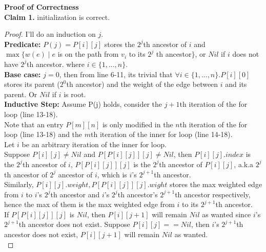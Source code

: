 \documentclass[11pt]{article}
\begin{document}
\textbf{Proof of Correctness} \\
\textbf{Claim 1. } initialization is correct. 
\begin{proof} I'll do an induction on $j$. \\
\textbf{Predicate: } $P(j) = P[i][j]$ stores the $2^j$th ancestor of $i$ and \\
$\max\{w(e)\mid e$ is on the path from $v_i$ to its $2^j$ th ancestor$\}$, or $Nil$ if $i$ does not have $2^j$th ancestor. where $i\in\{1,...,n\}$.\\[2ex]
\textbf{Base case: } $j=0$, then from line 6-11, its trivial that $\forall i\in\{1,...,n\}. P[i][0]$ stores its parent ($2^0$th ancestor) and the weight of the edge between $i$ and its parent. Or $Nil$ if $i$ is root. \\[2ex]
\textbf{Inductive Step: } Assume P(j) holds, consider the $j+1$th iteration of the for loop (line 13-18).\\
Note that an entry $ P[m][n]$ is only modified in the $n$th iteration of the for loop (line 13-18) and the $m$th iteration of the inner for loop (line 14-18). \\
Let $i$ be an arbitrary iteration of the inner for loop. \\
Suppose $P[i][j] \neq Nil$ and $P[P[i][j]][j] \neq Nil$, then $P[i][j].index$ is the $2^j$th ancestor of $i$, $P[P[i][j]][j]$ is the $2^j$th ancestor of $P[i][j]$, a.k.a $2^j$th ancestor of $2^j$ ancestor of $i$, which is $i$'s $2^{j+1}$th ancestor.\\ Similarly, $P[i][j].weight, P[P[i][j]][j].wight$ stores the max weighted edge from $i$ to $i$'s $2^j$th ancestor and $i$'s $2^j$th ancestor's $2^{j+1}$th ancestor respectively, hence the max of them is the max weighted edge from $i$ to its $2^{j+1}$th ancestor.\\
If $P[P[i][j]][j]$ is $Nil$, then $P[i][j+1]$ will remain $Nil$ as wanted since $i$'s $2^{j+1}$th ancestor does not exist. 
Suppose $P[i][j] == Nil$, then $i$'s $2^{j+1}$th ancestor does not exist, $P[i][j+1]$ will remain $Nil$ as wanted.\\[2ex]
\end{proof}
\end{document}
